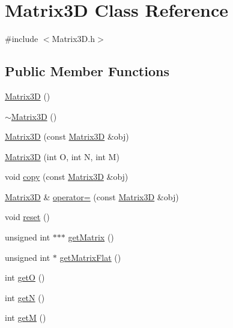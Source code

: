 \hypertarget{classMatrix3D}{\section{Matrix3\-D Class Reference}
\label{classMatrix3D}
}


{\ttfamily \#include $<$Matrix3\-D.\-h$>$}

\subsection*{Public Member Functions}
\begin{DoxyCompactItemize}
\item 
\hyperlink{classMatrix3D_afe9c6b7abe858fe9f6aea8f0607a00a7}{Matrix3\-D} ()
\item 
\hyperlink{classMatrix3D_a67ebf80ff62e71d327066491811401af}{$\sim$\-Matrix3\-D} ()
\item 
\hyperlink{classMatrix3D_a51455404cc25fe88aeaaca00ed84c9ee}{Matrix3\-D} (const \hyperlink{classMatrix3D}{Matrix3\-D} \&obj)
\item 
\hyperlink{classMatrix3D_a3c37d27fa112e9d658a12e0f9316465c}{Matrix3\-D} (int O, int N, int M)
\item 
void \hyperlink{classMatrix3D_a8e59f8086014545c9903c19285e1633c}{copy} (const \hyperlink{classMatrix3D}{Matrix3\-D} \&obj)
\item 
\hyperlink{classMatrix3D}{Matrix3\-D} \& \hyperlink{classMatrix3D_a6fdf8e427536d117728ebaa553299536}{operator=} (const \hyperlink{classMatrix3D}{Matrix3\-D} \&obj)
\item 
void \hyperlink{classMatrix3D_ac33fc82014b8044fca2d2a0c66198af7}{reset} ()
\item 
unsigned int $\ast$$\ast$$\ast$ \hyperlink{classMatrix3D_add08639722074b7937673ec3c32244a0}{get\-Matrix} ()
\item 
unsigned int $\ast$ \hyperlink{classMatrix3D_a50c9ddd36d2bb1c04c6439990f0770da}{get\-Matrix\-Flat} ()
\item 
int \hyperlink{classMatrix3D_aeae51b36ac95e7776c59d2055eea33b1}{get\-O} ()
\item 
int \hyperlink{classMatrix3D_aa3c40df02838ee04d18ae40c6c4c5e3f}{get\-N} ()
\item 
int \hyperlink{classMatrix3D_af0071aecbd9d8af56d2d30c92f9d970e}{get\-M} ()
\end{DoxyCompactItemize}


